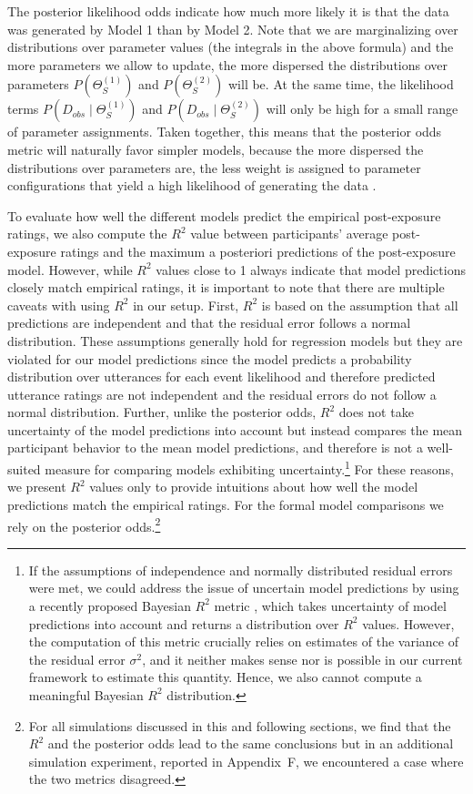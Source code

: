 \documentclass[man, floatsintext]{apa6}
\begin{document}
\noindent The posterior likelihood odds indicate how much more likely it is that the data was generated by Model 1 than by Model 2. Note that we are marginalizing over distributions over parameter values (the integrals in the above formula) and the more parameters we allow to update, the more dispersed the distributions over parameters  $P\left(\Theta_{S}^{(1)}\right)$ and $P\left(\Theta_{S}^{(2)}\right)$ will be. At the same time, the likelihood terms $P\left(D_{obs} \mid \Theta_{S}^{(1)}\right)$ and $P\left(D_{obs} \mid \Theta_{S}^{(2)}\right)$ will only be high for a small range of parameter assignments. Taken together, this means that the posterior odds metric will naturally favor simpler models, because the more dispersed the distributions over parameters are, the less weight is assigned to parameter configurations that yield a high likelihood of generating the data \parencite[a property often referred to as Bayesian Occam's razor; see, e.g., ][]{MacKay1992,Neal1995}. 

To evaluate how well the different models predict the empirical post-exposure ratings, we also compute the $R^2$ value between participants' average 
post-exposure ratings and the maximum a posteriori predictions of the post-exposure model. However, while $R^2$ values close to 1 always indicate 
that model predictions closely match empirical ratings, it is important to note that there are multiple caveats with using $R^2$ in our setup. 
First, $R^2$ is based on the assumption that all predictions are independent and that the residual error follows a normal distribution. 
These assumptions generally hold for regression models but they are violated for our model predictions since the model predicts a 
probability distribution over utterances for each event likelihood and therefore predicted utterance ratings are not independent and the 
residual errors do not follow a normal distribution. Further, unlike the posterior odds,
$R^2$ does not take uncertainty of the model predictions into account but instead compares the mean participant behavior to the mean 
model predictions, and therefore is not a well-suited measure for comparing models exhibiting uncertainty.\footnote{If the assumptions of independence and normally distributed 
residual errors were met, we could address the issue of uncertain model predictions by using a recently proposed Bayesian $R^2$ metric \parencite{Gelman2019}, 
which takes uncertainty of model predictions into account and returns a distribution over $R^2$ values. 
However, the computation of this metric crucially relies on estimates of the variance of the residual error $\sigma^2$, and it neither 
makes sense nor is possible in our current framework to estimate this quantity. Hence, we also cannot compute a meaningful Bayesian $R^2$ distribution.} 
For these reasons, we present $R^2$ values only to provide intuitions about how well the model predictions match the empirical ratings. For the formal model comparisons we 
rely on the posterior odds.\footnote{For all simulations discussed in this and following sections, we find that the $R^2$ and the posterior odds lead to the same conclusions but in an additional simulation experiment, reported in Appendix~F, we encountered a case where the two metrics disagreed.} 
\end{document}
